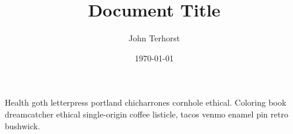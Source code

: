 \documentclass[12pt]{article}
\title{Document Title}
\author{John Terhorst}
\date{\today}
\begin{document}
\maketitle

Health goth letterpress portland chicharrones cornhole ethical. Coloring book dreamcatcher ethical single-origin coffee listicle, tacos venmo enamel pin retro bushwick. 
\end{document}
